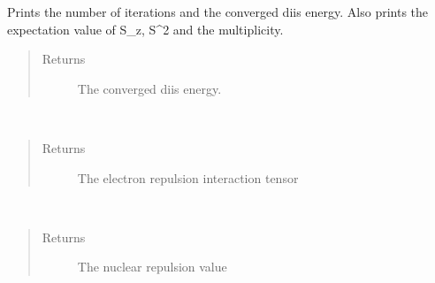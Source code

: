 \documentclass[letterpaper,10pt,english]{sphinxmanual}
\begin{document}
\begin{fulllineitems}
\begin{fulllineitems}
\begin{quote}
\begin{description}
\end{description}\end{quote}

\end{fulllineitems}


\begin{fulllineitems}
\label{\detokenize{UHF:ghf.UHF.UHF.get_scf_solution_diis}}
Prints the number of iterations and the converged diis energy.
Also prints the expectation value of S\_z, S\textasciicircum{}2 and the multiplicity.
\begin{quote}\begin{description}
\item[{Returns}] \leavevmode
The converged diis energy.

\end{description}\end{quote}

\end{fulllineitems}


\begin{fulllineitems}
\label{\detokenize{UHF:ghf.UHF.UHF.get_two_e}}~\begin{quote}\begin{description}
\item[{Returns}] \leavevmode
The electron repulsion interaction tensor

\end{description}\end{quote}

\end{fulllineitems}


\begin{fulllineitems}
\label{\detokenize{UHF:ghf.UHF.UHF.nuc_rep}}~\begin{quote}\begin{description}
\item[{Returns}] \leavevmode
The nuclear repulsion value


\end{description}
\end{quote}
\end{fulllineitems}
\end{fulllineitems}
\end{document}
